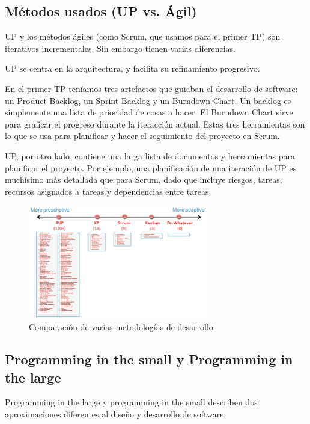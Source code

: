\subsection{Métodos usados (UP vs. Ágil)}

UP y los métodos ágiles (como Scrum, que usamos para el primer TP) son iterativos incrementales. Sin embargo tienen varias diferencias.

UP se centra en la arquitectura, y facilita su refinamiento progresivo.

En el primer TP teníamos tres artefactos que guiaban el desarrollo de software: un Product Backlog, un Sprint Backlog y un Burndown Chart. Un backlog es simplemente una lista de prioridad de cosas a hacer. El Burndown Chart sirve para graficar el progreso durante la iteracción actual. Estas tres herramientas son lo que se usa para planificar y hacer el seguimiento del proyecto en Scrum.

UP, por otro lado, contiene una larga lista de documentos y herramientas para planificar el proyecto. Por ejemplo, una planificación de una iteración de UP es muchísimo más detallada que para Scrum, dado que incluye riesgos, tareas, recursos asignados a tareas y dependencias entre tareas.


\begin{figure}[H]
  \centering
  \includegraphics[width=0.7\textwidth]{img/up-agile.png}
  \caption{\normalfont Comparación de varias metodologías de desarrollo.}
\end{figure} 

\subsection{Programming in the small y Programming in the large}

Programming in the large y programming in the small describen dos aproximaciones diferentes al diseño y desarrollo de software. 

